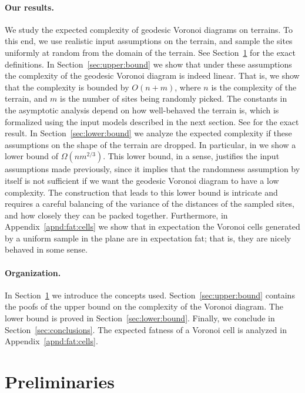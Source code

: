 \documentclass[12pt]{article}
\newcommand{\pth}[2][\!]{#1\left({#2}\right)}
\newcommand{\seclab}[1]{\label{sec:#1}}
\newcommand{\secref}[1]{Section~\ref{sec:#1}}
\newcommand{\apndref}[1]{Appendix~\ref{apnd:#1}}
\begin{document}
\paragraph{Our results.}
We study the expected complexity of geodesic Voronoi diagrams on
terrains.  To this end, we use realistic input assumptions on the
terrain, and sample the sites uniformly at random from the domain of
the terrain. See \secref{prelims} for the exact definitions.  In
\secref{upper:bound} we show that under these assumptions the
complexity of the geodesic Voronoi diagram is indeed linear. That is,
we show that the complexity is bounded by $O(n+m)$, where $n$ is the
complexity of the terrain, and $m$ is the number of sites being
randomly picked.  The constants in the asymptotic analysis depend on
how well-behaved the terrain is, which is formalized using the input
models described in the next section. See  for the exact
result.  In \secref{lower:bound} we analyze the expected complexity if
these assumptions on the shape of the terrain are dropped. In
particular, in  we show a lower bound of
$\Omega\pth{nm^{2/3}}$.  This lower bound, in a sense, justifies the
input assumptions made previously, since it implies that the
randomness assumption by itself is not sufficient if we want the
geodesic Voronoi diagram to have a low complexity.  The construction
that leads to this lower bound is intricate and requires a careful
balancing of the variance of the distances of the sampled sites, and
how closely they can be packed together.  Furthermore, in
\apndref{fat:cells} we show that in expectation the Voronoi cells
generated by a uniform sample in the plane are in expectation fat;
that is, they are nicely behaved in some sense.




\paragraph{Organization.}
In \secref{prelims} we introduce the concepts used.
\secref{upper:bound} contains the poofs of the upper bound on the
complexity of the Voronoi diagram. The lower bound is proved in
\secref{lower:bound}. Finally, we conclude in \secref{conclusions}.
The expected fatness of a Voronoi cell is analyzed in
\apndref{fat:cells}.

\section{Preliminaries}
\seclab{prelims}
\end{document}
